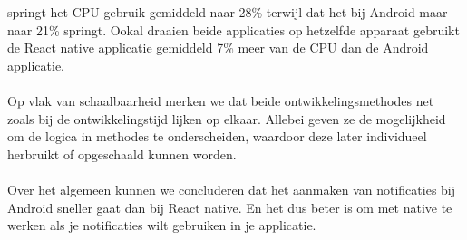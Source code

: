 springt het CPU gebruik gemiddeld naar 28\% terwijl dat het bij Android maar naar 21\% springt. Ookal 
draaien beide applicaties op hetzelfde apparaat gebruikt de React native applicatie gemiddeld 7\% meer 
van de CPU dan de Android applicatie.
\\\\
Op vlak van schaalbaarheid merken we dat beide ontwikkelingsmethodes net zoals bij de ontwikkelingstijd 
lijken op elkaar. Allebei geven ze de mogelijkheid om de logica in methodes te onderscheiden, 
waardoor deze later individueel herbruikt of opgeschaald kunnen worden.
\\\\
Over het algemeen kunnen we concluderen dat het aanmaken van notificaties bij Android sneller gaat dan bij
React native. En het dus beter is om met native te werken als je notificaties wilt gebruiken in je applicatie.























